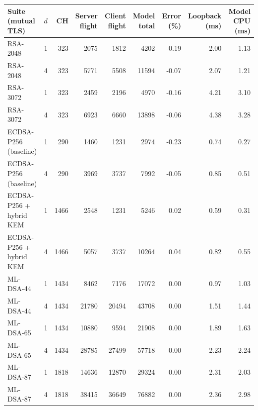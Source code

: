 \begin{tabular}{@{}lrrrrrrrr@{}}
\toprule
Suite (mutual TLS) & $d$ & CH & Server flight & Client flight & Model total & Error (\%) & Loopback (ms) & Model CPU (ms) \\
\midrule
RSA-2048 & 1 & 323 & 2075 & 1812 & 4202 & -0.19 & 2.00 & 1.13 \\
RSA-2048 & 4 & 323 & 5771 & 5508 & 11594 & -0.07 & 2.07 & 1.21 \\
RSA-3072 & 1 & 323 & 2459 & 2196 & 4970 & -0.16 & 4.21 & 3.10 \\
RSA-3072 & 4 & 323 & 6923 & 6660 & 13898 & -0.06 & 4.38 & 3.28 \\
ECDSA-P256 (baseline) & 1 & 290 & 1460 & 1231 & 2974 & -0.23 & 0.74 & 0.27 \\
ECDSA-P256 (baseline) & 4 & 290 & 3969 & 3737 & 7992 & -0.05 & 0.85 & 0.51 \\
ECDSA-P256 + hybrid KEM & 1 & 1466 & 2548 & 1231 & 5246 & 0.02 & 0.59 & 0.31 \\
ECDSA-P256 + hybrid KEM & 4 & 1466 & 5057 & 3737 & 10264 & 0.04 & 0.82 & 0.55 \\
ML-DSA-44 & 1 & 1434 & 8462 & 7176 & 17072 & 0.00 & 0.97 & 1.03 \\
ML-DSA-44 & 4 & 1434 & 21780 & 20494 & 43708 & 0.00 & 1.51 & 1.44 \\
ML-DSA-65 & 1 & 1434 & 10880 & 9594 & 21908 & 0.00 & 1.89 & 1.63 \\
ML-DSA-65 & 4 & 1434 & 28785 & 27499 & 57718 & 0.00 & 2.23 & 2.24 \\
ML-DSA-87 & 1 & 1818 & 14636 & 12870 & 29324 & 0.00 & 2.31 & 2.03 \\
ML-DSA-87 & 4 & 1818 & 38415 & 36649 & 76882 & 0.00 & 2.36 & 2.98 \\
\bottomrule
\end{tabular}
